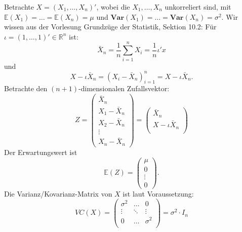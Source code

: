 \documentclass[10pt]{article}
\newcommand{\FZV}{X_1, \ldots, X_n} %
\newcommand{\IR}{\mathbb{R}} %
\newcommand{\EW}{\mathbb{E}} %
\newcommand{\Var}{\textbf{Var}} %
\newcommand{\sni}{\sum_{i=1}^{n}} %
\newenvironment{BSP}[1][]
{\begin{Beispiel}[frametitle=#1]}{\end{Beispiel}}
\begin{document}
            
			\begin{BSP}[Beispiel 3.0.1 (komponentenweise Unkorreliertheit)]
				Betrachte $X = (\FZV)'$, wobei die $\FZV$ unkorreliert sind, mit $\EW(X_1) = \ldots = \EW(X_n) = \mu$ und $\Var(X_1) = \ldots = \Var(X_n) = \sigma^2$. 
				Wir wissen aus der Vorlesung Grundzüge der Statistik, Sektion 10.2:
				Für $\iota = (1,\ldots,1)' \in \IR^n$ ist:
				\begin{equation*}
					\bar{X}_n = \frac{1}{n} \sni X_i = \frac{1}{n} \iota' x
				\end{equation*}
				und 
				\begin{equation*}
					X-\iota\bar{X}_n = (X_i - \bar{X}_n)^n_{i=1} = X - \iota \bar{X}_n.
				\end{equation*}
				Betrachte den $(n+1)$-dimensionalen Zufallsvektor:
				\begin{equation*}
					Z = \left(
					\begin{array}{c}
						\bar{X}_n\\
						X_1 - \bar{X}_n\\
						X_2 - \bar{X}_n\\
						\vdots\\
						X_n - \bar{X}_n
					\end{array}
					\right) = \left(
					\begin{array}{c}
						\bar{X}_n\\
						X - \iota \bar{X}_n\\
					\end{array}
					\right)
				\end{equation*}
				Der Erwartungswert ist
				\begin{equation*}
					\EW(Z) = \left(
					\begin{array}{c}
						\mu\\
						0\\
						\vdots\\
						0
					\end{array}
					\right).
				\end{equation*}
				Die Varianz/Kovarianz-Matrix von $X$ ist laut Voraussetzung:
				\begin{equation*}
					VC(X) = \begin{pmatrix}
						\sigma^2 & \ldots & 0\\
						\vdots & \ddots & \vdots\\
						0 & \ldots & \sigma^2\\
					\end{pmatrix} = \sigma^2 \cdot I_n
				\end{equation*}

\end{BSP}
\end{document}

